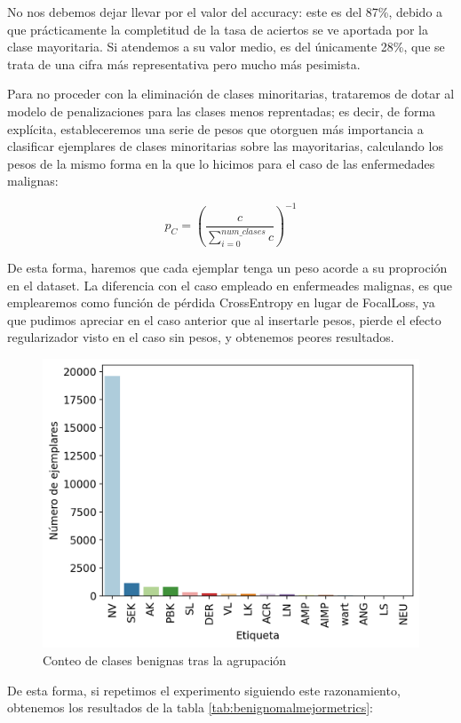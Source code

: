 No nos debemos dejar llevar por el valor del accuracy: este es del 87\%, debido a que prácticamente la completitud de la tasa de aciertos se ve aportada por la clase mayoritaria. Si atendemos a su valor medio, es del únicamente 28\%, que se trata de una cifra más representativa pero mucho más pesimista.

Para no proceder con la eliminación de clases minoritarias, trataremos de dotar al modelo de penalizaciones para las clases menos reprentadas; es decir, de forma explícita, estableceremos una serie de pesos que otorguen más importancia a clasificar ejemplares de clases minoritarias sobre las mayoritarias, calculando los pesos de la mismo forma en la que lo hicimos para el caso de las enfermedades malignas:

$$p_C =(\frac{c}{\sum_{i=0}^{num\_clases} c} )^{-1}$$

De esta forma, haremos que cada ejemplar tenga un peso acorde a su proproción en el dataset. La diferencia con el caso empleado en enfermeades malignas, es que emplearemos como función de pérdida CrossEntropy en lugar de FocalLoss, ya que pudimos apreciar en el caso anterior que al insertarle pesos, pierde el efecto regularizador visto en el caso sin pesos, y obtenemos peores resultados.

\begin{figure}[H]
	\centering
	\includegraphics[scale = 0.7]{imagenes/countbenign_corrected.png}
	\caption{Conteo de clases benignas tras la agrupación}
	\label {fig:buenasred}
\end{figure}

De esta forma, si repetimos el experimento siguiendo este razonamiento, obtenemos los resultados de la tabla \ref{tab:benignomalmejormetrics}:


